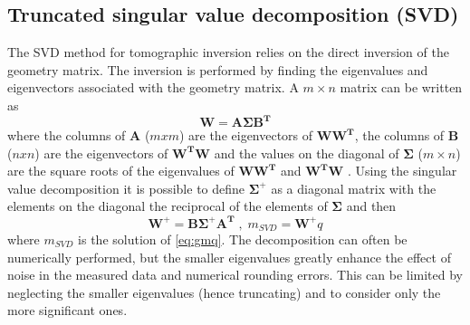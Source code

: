 \subsection{Truncated singular value decomposition (SVD)}
The SVD method for tomographic inversion relies on the direct inversion of the geometry matrix. The inversion is performed by finding the eigenvalues and eigenvectors associated with the geometry matrix. A $m \times n$ matrix can be written as 
\begin{equation}
\bm{W} = \bm{A \Sigma B^T}
\label{eq:svg1}
\end{equation}
where the columns of $\bm{A}$ ($mxm$) are the eigenvectors of $\bm{WW^T}$, the columns of $\bm{B}$ ($nxn$) are the eigenvectors of $\bm{W^TW}$ and the values on the diagonal of $\bm{\Sigma}$ ($m \times n$) are the square roots of the eigenvalues of $\bm{WW^T}$ and $\bm{W^TW}$ \cite{Hansen1992}. Using the singular value decomposition it is possible to define $\bm{\Sigma}^+$ as a diagonal matrix with the elements on the diagonal the reciprocal of the elements of $\bm{\Sigma}$ and then
\begin{equation}
\bm{W^+} = \bm{B \Sigma^+ A^T} \; , \; m_{SVD} = \bm{W^+} q
\label{eq:svg2}
\end{equation}
where $m_{SVD}$ is the solution of \autoref{eq:gmq}.
The decomposition can often be numerically performed, but the smaller eigenvalues greatly enhance the effect of noise in the measured data and numerical rounding errors. \cite{Schou2015} This can be limited by neglecting the smaller eigenvalues (hence truncating) and to consider only the more significant ones.
